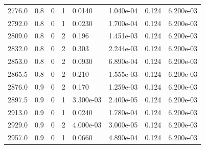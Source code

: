 \documentclass[preview]{standalone}
\begin{document}
{{{{{\begin{tabular}{L{1.2cm}C{1.2cm} C{0.3cm}C{0.5cm} C{1.4cm}C{1.4cm} C{1.4cm}C{1.4cm}}
  2776.0  &   0.8  & 0     &  1 &  0.0140  & 1.040e-04  & 0.124 &  6.200e-03   \\ 
  2792.0  &   0.8  & 0     &  1 &  0.0230  & 1.700e-04  & 0.124 &  6.200e-03   \\ 
  2809.0  &   0.8  & 0     &  2 &  0.196  & 1.451e-03  & 0.124 &  6.200e-03   \\ 
  2832.0  &   0.8  & 0     &  2 &  0.303  & 2.244e-03  & 0.124 &  6.200e-03   \\ 
  2853.0  &   0.8  & 0     &  2 &  0.0930  & 6.890e-04  & 0.124 &  6.200e-03   \\ 
  2865.5  &   0.8  & 0     &  2 &  0.210  & 1.555e-03  & 0.124 &  6.200e-03   \\ 
  2876.0  &   0.9  & 0     &  2 &  0.170  & 1.259e-03  & 0.124 &  6.200e-03   \\ 
  2897.5  &   0.9  & 0     &  1 &  3.300e-03  & 2.400e-05  & 0.124 &  6.200e-03   \\ 
  2913.0  &   0.9  & 0     &  1 &  0.0240  & 1.780e-04  & 0.124 &  6.200e-03   \\ 
  2929.0  &   0.9  & 0     &  2 &  4.000e-03  & 3.000e-05  & 0.124 &  6.200e-03   \\ 
  2957.0  &   0.9  & 0     &  1 &  0.0660  & 4.890e-04  & 0.124 &  6.200e-03   \\ 
\hline 
\end{tabular} 

}}}}}
\end{document}
